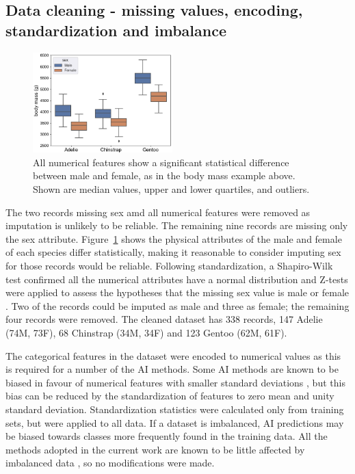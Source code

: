 \documentclass[a4paper, 11pt]{article}
\begin{document}
\vspace{\baselineskip}
\subsection*{Data cleaning - missing values, encoding, standardization and imbalance}

\begin{figure} %
  \centering
  \vspace{-1.2\baselineskip} %
  \includegraphics[width=0.48\textwidth]{sex.png} %
  \vspace{-0.5\baselineskip} %
  \caption{\centering\linespread{0.8}\selectfont All numerical features show a significant statistical difference between male and female, 
  as in the body mass example above. Shown are median values, upper and lower quartiles, 
  and outliers.}
  \vspace{-0.5\baselineskip} %
  \label{fig:sex}
\end{figure}   

The two records missing sex amd all numerical features were removed as imputation is unlikely to be reliable. 
The remaining nine records are missing only the sex attribute. Figure~\ref{fig:sex} shows the physical 
attributes of the male and female of each species differ statistically, making it reasonable to 
consider imputing sex for those records would be reliable. Following standardization, 
a Shapiro-Wilk test confirmed all the numerical attributes have a normal distribution \cite{shapiro1965analysis} 
and Z-tests were applied to assess the 
hypotheses that the missing sex value is male or female \cite{freedman2007statistics}. 
Two of the records could be imputed as male and three as female; the remaining four records were removed. 
The cleaned dataset has 338 records, 147 Adelie  
(74M, 73F), 68 Chinstrap (34M, 34F) and 123 Gentoo (62M, 61F).

The categorical features in the dataset were encoded to numerical values as this is required for a number of the AI methods. 
Some AI methods are known to be biased in favour of numerical features 
with smaller standard deviations \cite{hastie2009elements}, but this bias can be reduced by the standardization 
of features to zero mean and unity standard deviation. Standardization statistics were calculated only from 
training sets, but were applied to all data. 
If a dataset is imbalanced, AI predictions may be biased towards classes more frequently found in the training data. 
All the methods adopted in the current work are known to be little affected by 
imbalanced data \cite{he2009learning}, so no modifications were made.
\end{document}
